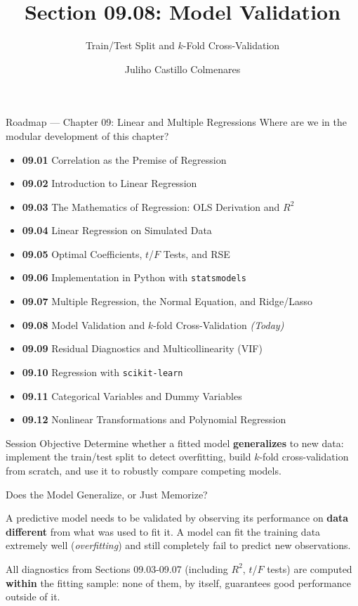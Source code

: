 \documentclass[10pt, aspectratio=169]{beamer}
\title[Model Validation]{Section 09.08: Model Validation}
\subtitle{Train/Test Split and $k$-Fold Cross-Validation}
\author[J. Castillo Colmenares]{Juliho Castillo Colmenares}
\institute{Tecnológico de Monterrey}
\date{\vspace{-1.5cm}}
\begin{document}
\begin{frame}[plain]
  \titlepage
\end{frame}

\begin{frame}{Roadmap --- Chapter 09: Linear and Multiple Regressions}
  \scriptsize
  Where are we in the modular development of this chapter?
  \begin{itemize}\itemsep=0.02em
    \item \textbf{09.01} Correlation as the Premise of Regression
    \item \textbf{09.02} Introduction to Linear Regression
    \item \textbf{09.03} The Mathematics of Regression: OLS Derivation and $R^2$
    \item \textbf{09.04} Linear Regression on Simulated Data
    \item \textbf{09.05} Optimal Coefficients, $t$/$F$ Tests, and RSE
    \item \textbf{09.06} Implementation in Python with \texttt{statsmodels}
    \item \textbf{09.07} Multiple Regression, the Normal Equation, and Ridge/Lasso
    \item \textbf{09.08} Model Validation and $k$-fold Cross-Validation \emph{(Today)}
    \item \textbf{09.09} Residual Diagnostics and Multicollinearity (VIF)
    \item \textbf{09.10} Regression with \texttt{scikit-learn}
    \item \textbf{09.11} Categorical Variables and Dummy Variables
    \item \textbf{09.12} Nonlinear Transformations and Polynomial Regression
  \end{itemize}
  \pause
  \vspace{-0.05cm}
  \begin{block}{Session Objective}
    Determine whether a fitted model \textbf{generalizes} to new data: implement the train/test split to detect overfitting, build $k$-fold cross-validation from scratch, and use it to robustly compare competing models.
  \end{block}
\end{frame}

\begin{frame}{Does the Model Generalize, or Just Memorize?}
  \footnotesize
  \begin{motivacion}
    A predictive model needs to be validated by observing its performance on \textbf{data different} from what was used to fit it. A model can fit the training data extremely well (\emph{overfitting}) and still completely fail to predict new observations.
  \end{motivacion}

  \vspace{0.15cm}
  \pause
  All diagnostics from Sections 09.03-09.07 (including $R^2$, $t$/$F$ tests) are computed \textbf{within} the fitting sample: none of them, by itself, guarantees good performance outside of it.
\end{frame}
\end{document}
